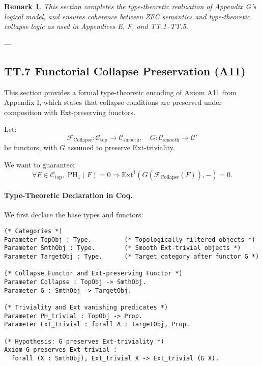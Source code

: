 \documentclass[11pt]{article}
\newtheorem{remark}[theorem]{Remark}
\begin{document}
{\begin{remark}
This section completes the type-theoretic realization of Appendix G’s logical model,  
and ensures coherence between ZFC semantics and type-theoretic collapse logic  
as used in Appendices E, F, and TT.1–TT.5.
\end{remark}

---

\subsection*{TT.7 Functorial Collapse Preservation (A11)}

This section provides a formal type-theoretic encoding of Axiom A11 from Appendix I,  
which states that collapse conditions are preserved under composition with Ext-preserving functors.

Let:
\[
\mathcal{F}_{\mathrm{Collapse}} : \mathcal{C}_{\mathrm{top}} \to \mathcal{C}_{\mathrm{smooth}},
\quad
G : \mathcal{C}_{\mathrm{smooth}} \to \mathcal{C}'
\]
be functors, with \( G \) assumed to preserve Ext-triviality.

We want to guarantee:
\[
\forall F \in \mathcal{C}_{\mathrm{top}},\;
\mathrm{PH}_1(F) = 0 \Rightarrow \mathrm{Ext}^1(G(\mathcal{F}_{\mathrm{Collapse}}(F)), -) = 0.
\]

\paragraph{Type-Theoretic Declaration in Coq.}

We first declare the base types and functors:

\begin{lstlisting}[language=Coq]
(* Categories *)
Parameter TopObj : Type.         (* Topologically filtered objects *)
Parameter SmthObj : Type.        (* Smooth Ext-trivial objects *)
Parameter TargetObj : Type.      (* Target category after functor G *)

(* Collapse Functor and Ext-preserving Functor *)
Parameter Collapse : TopObj -> SmthObj.
Parameter G : SmthObj -> TargetObj.

(* Triviality and Ext vanishing predicates *)
Parameter PH_trivial : TopObj -> Prop.
Parameter Ext_trivial : forall A : TargetObj, Prop.

(* Hypothesis: G preserves Ext-triviality *)
Axiom G_preserves_Ext_trivial :
  forall (X : SmthObj), Ext_trivial X -> Ext_trivial (G X).


\end{lstlisting}}
\end{document}
